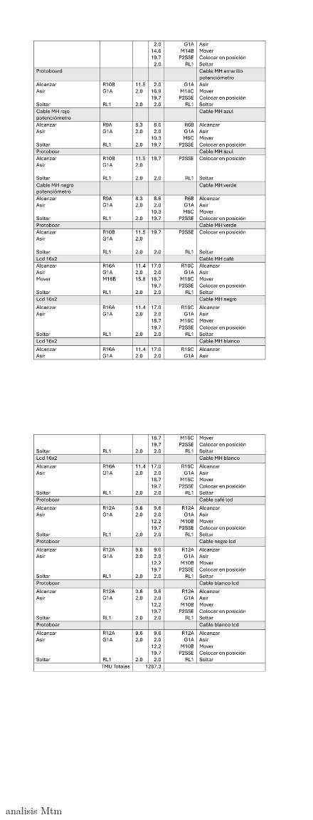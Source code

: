 \begin{figure}[H]
    \includegraphics[scale=0.21]{13/img/analisMtmDos.pdf}
    \centering
    \includegraphics[scale=0.21]{13/img/analisMtmTres.pdf}
    \caption{analisis Mtm}
    \label{fig:analisis Mtm}
\end{figure}
% 
